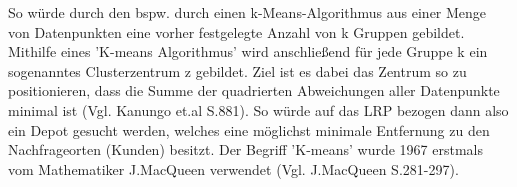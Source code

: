 \documentclass[a4paper,12pt,parskip,bibtotoc,liststotoc]{article}
\begin{document}
So würde durch den bspw. durch einen k-Means-Algorithmus aus einer Menge von Datenpunkten eine vorher festgelegte Anzahl von k Gruppen gebildet. 
Mithilfe eines 'K-means Algorithmus' wird anschließend für jede Gruppe k ein sogenanntes Clusterzentrum z gebildet.
Ziel ist es dabei das Zentrum so zu positionieren, dass die Summe der quadrierten Abweichungen aller Datenpunkte minimal ist (Vgl. Kanungo et.al S.881).
So würde auf das LRP bezogen dann also ein Depot gesucht werden, welches eine möglichst minimale Entfernung zu den Nachfrageorten (Kunden) besitzt.
Der Begriff 'K-means' wurde 1967 erstmals vom Mathematiker J.MacQueen verwendet (Vgl. J.MacQueen S.281-297).
%
%
\end{document}
